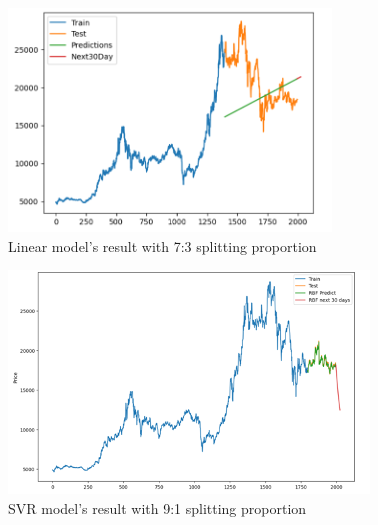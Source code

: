 \documentclass{ieeeojies}
\begin{document}
\begin{figure}[H]
  \centering
  \begin{minipage}{0.8\linewidth}
    \centering
    \includegraphics[width=\linewidth]{bibliography/LN_MBB73.png}
    \caption{Linear model's result with 7:3 splitting proportion}
    \label{fig15}
  \end{minipage}
\end{figure}
\begin{figure}[H]
  \centering
  \begin{minipage}{0.8\linewidth}
    \centering
    \includegraphics[width=\linewidth]{bibliography/SVR_MBB91.png}
    \caption{SVR model's result with 9:1 splitting proportion}
    \label{fig16}
  \end{minipage}
\end{figure}
\end{document}
